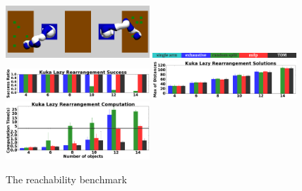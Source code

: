 {\begin{figure}[h]
	\centering
	\includegraphics[width=0.48\textwidth]{figures/reachability}
	\includegraphics[width=0.48\textwidth]{figures/results/labels}
	\includegraphics[width=0.48\textwidth]{figures/results/5_kuka_lazy_ms_success.png}
	\includegraphics[width=0.48\textwidth]{figures/results/5_kuka_lazy_ms_cost.png}
	\includegraphics[width=0.48\textwidth]{figures/results/5_kuka_lazy_ms_time.png}
	\caption{The reachability benchmark}
	\label{fig:reachability_benchmark}
\end{figure}
}

